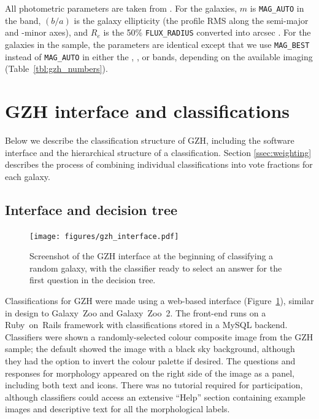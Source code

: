 \documentclass[a4paper,fleqn,usenatbib]{mnras}
\begin{document}
All photometric parameters are taken from \sextractor. For the \ferengi{}
galaxies, $m$ is {\tt MAG\_AUTO} in the \Iband{} band, $(b/a)$ is the galaxy
ellipticity (the profile RMS along the semi-major and -minor axes), and $R_e$
is the 50\% {\tt FLUX\_RADIUS} converted into arcsec \citep{mel16}. For the \hst{} galaxies in the \main{} sample,
the parameters are identical except that we use {\tt MAG\_BEST} instead of
{\tt MAG\_AUTO} \citep{gri12} in either the \Iband, \iband, or \zband{} bands, depending 
on the available imaging (Table~\ref{tbl:gzh_numbers}).


\section{GZH interface and classifications}\label{sec:interface}

Below we describe the classification structure of GZH, including the software 
interface and the hierarchical structure of a classification. Section \ref{ssec:weighting}
describes the process of combining individual classifications into vote fractions for each
galaxy.

\subsection{Interface and decision tree}\label{ssec:interface}

\begin{figure}
\center
\texttt{[image: figures/gzh\_interface.pdf]}
\caption{Screenshot of the GZH interface at
the beginning of classifying a random galaxy, with the classifier ready
to select an answer for the first question in the decision
tree.\label{fig:interface}}
\end{figure}

Classifications for GZH were made using a web-based interface
(Figure~\ref{fig:interface}), similar in design to Galaxy~Zoo and Galaxy~Zoo~2.
The front-end runs on a Ruby~on~Rails framework with classifications stored in
a MySQL backend. Classifiers were shown a randomly-selected colour composite image from
the GZH sample; the default showed the image with a black sky background,
although they had the option to invert the colour palette if desired. The
questions and responses for morphology appeared on the right side of the image as
a panel, including both text and icons. There was no tutorial required for
participation, although classifiers could access an extensive ``Help'' section
containing example images and descriptive text for all the morphological
labels. 
\end{document}
